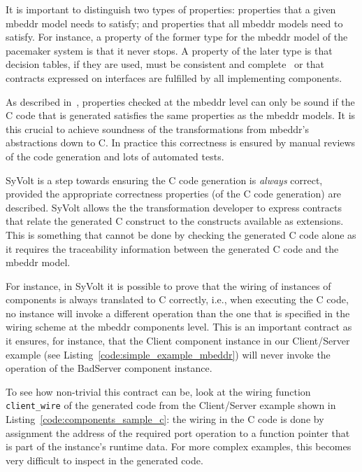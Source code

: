 It is important to distinguish two types of properties: properties that a given
mbeddr model needs to satisfy; and properties that all mbeddr models need to
satisfy. For instance, a property of the former type for the mbeddr model of the
pacemaker system is that it never stops. A property of the later type is that
decision tables, if they are used, must be consistent and
complete~\cite{Ratiu:2012:LEE:2663689.2663692} or that contracts expressed on
interfaces are fulfilled by all implementing components.

As described in~\cite{Ratiu:2012:LEE:2663689.2663692}, properties checked at the
mbeddr level can only be sound if the C code that is generated satisfies the
same properties as the mbeddr models. It is this crucial to achieve soundness of
the transformations from mbeddr's abstractions down to C. In practice this
correctness is ensured by manual reviews of the code generation and
lots of automated tests.

SyVolt is a step towards ensuring the C code generation is \emph{always}
correct, provided the appropriate correctness properties (of the C code
generation) are described. SyVolt allows the the transformation developer to
express contracts that relate the generated C construct to the constructs
available as extensions. This is something that cannot be done by checking the
generated C code alone as it requires the traceability information between the
generated C code and the mbeddr model.

 For instance, in SyVolt it is possible to prove that the
wiring of instances of components is always translated to C correctly, i.e.,
when executing the C code, no instance will invoke a different operation than
the one that is specified in the wiring scheme at the mbeddr components level.
This is an important contract as it ensures, for instance, that the Client
component instance in our Client/Server example (see
Listing~\ref{code:simple_example_mbeddr}) will never invoke the operation of the
BadServer component instance.

To see how non-trivial this contract can be, look at the wiring function
\verb=client_wire= of the generated code from the Client/Server example shown in
Listing~\ref{code:components_sample_c}: the wiring in the C code is done by
assignment the address of the required port operation to a function pointer that
is part of the instance's runtime data. For more complex examples, this
becomes very difficult to inspect in the generated code.



